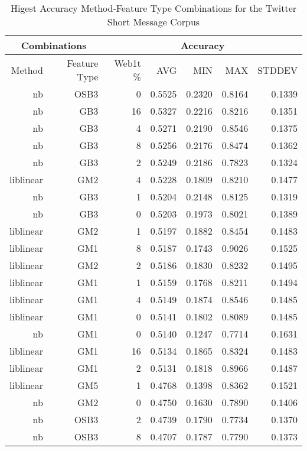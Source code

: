 	\begin{center}
	\begin{table}[h]
			\begin{tabular}{ | r | r | r | r | r | r | r | }
			\hline
			\multicolumn{2}{|c|}{Combinations} & \multicolumn{5}{|c|}{Accuracy}\\
			\hline
			Method & Feature Type & Web1t \% & AVG & MIN & MAX & STDDEV\\ \hline 
			nb & OSB3 & 0 & 0.5525 & 0.2320 & 0.8164 & 0.1339\\ \hline 
			nb & GB3 & 16 & 0.5327 & 0.2216 & 0.8216 & 0.1351\\ \hline 
			nb & GB3 & 4 & 0.5271 & 0.2190 & 0.8546 & 0.1375\\ \hline 
			nb & GB3 & 8 & 0.5256 & 0.2176 & 0.8474 & 0.1362\\ \hline 
			nb & GB3 & 2 & 0.5249 & 0.2186 & 0.7823 & 0.1324\\ \hline 
			liblinear & GM2 & 4 & 0.5228 & 0.1809 & 0.8210 & 0.1477\\ \hline 
			nb & GB3 & 1 & 0.5204 & 0.2148 & 0.8125 & 0.1319\\ \hline 
			nb & GB3 & 0 & 0.5203 & 0.1973 & 0.8021 & 0.1389\\ \hline 
			liblinear & GM2 & 1 & 0.5197 & 0.1882 & 0.8454 & 0.1483\\ \hline 
			liblinear & GM1 & 8 & 0.5187 & 0.1743 & 0.9026 & 0.1525\\ \hline 
			liblinear & GM2 & 2 & 0.5186 & 0.1830 & 0.8232 & 0.1495\\ \hline 
			liblinear & GM1 & 1 & 0.5159 & 0.1768 & 0.8211 & 0.1494\\ \hline 
			liblinear & GM1 & 4 & 0.5149 & 0.1874 & 0.8546 & 0.1485\\ \hline 
			liblinear & GM1 & 0 & 0.5141 & 0.1802 & 0.8089 & 0.1485\\ \hline 
			nb & GM1 & 0 & 0.5140 & 0.1247 & 0.7714 & 0.1631\\ \hline 
			liblinear & GM1 & 16 & 0.5134 & 0.1865 & 0.8324 & 0.1483\\ \hline 
			liblinear & GM1 & 2 & 0.5131 & 0.1818 & 0.8966 & 0.1487\\ \hline 
			liblinear & GM5 & 1 & 0.4768 & 0.1398 & 0.8362 & 0.1521\\ \hline 
			nb & GM2 & 0 & 0.4750 & 0.1630 & 0.7890 & 0.1406\\ \hline 
			nb & OSB3 & 2 & 0.4739 & 0.1790 & 0.7734 & 0.1370\\ \hline 
			nb & OSB3 & 8 & 0.4707 & 0.1787 & 0.7790 & 0.1373\\ \hline 

			\end{tabular}
		\caption{Higest Accuracy Method-Feature Type Combinations for the Twitter Short Message Corpus}
		\label{tab:twitter-accuracy-filtered-ranked}
	\end{table}
	\end{center}
	
